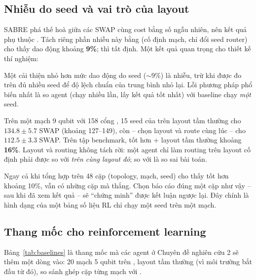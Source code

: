 \subsection{Nhiễu do seed và vai trò của layout}

SABRE phá thế hoà giữa các SWAP cùng cost bằng số ngẫu nhiên, nên kết quả phụ thuộc .
Tách riêng phần nhiễu này bằng  (cố định mạch, chỉ đổi seed router) cho
thấy  dao động khoảng \textbf{9\%};  thì tất định. Một kết
quả quan trọng cho thiết kế thí nghiệm:
\begin{keybox}
Một cải thiện nhỏ hơn mức dao động do seed ($\sim$9\%) là nhiễu, trừ khi được đo trên đủ nhiều seed để
độ lệch chuẩn của trung bình nhỏ lại. Lỗi phương pháp phổ biến nhất là so agent (chạy nhiều lần, lấy
kết quả tốt nhất) với baseline chạy \emph{một} seed.
\end{keybox}

Trên một mạch 9 qubit với 158 cổng \cx{}, 15 seed của  trên layout tầm thường cho
$134.8 \pm 5.7$ SWAP (khoảng 127--149), còn  -- chọn layout và route cùng lúc -- cho
$112.5 \pm 3.3$ SWAP. Trên tập benchmark,  tốt hơn  + layout tầm
thường khoảng \textbf{16\%}. Layout và routing không tách rời: một agent chỉ làm routing trên layout
cố định phải được so với  \emph{trên cùng layout đó}; so với  là so
sai bài toán.

Ngay cả khi tổng hợp trên 48 cặp (topology, mạch, seed) cho thấy  tốt hơn 
khoảng 10\%, vẫn có những cặp mà  thắng. Chọn báo cáo đúng một cặp như vậy -- sau khi đã
xem kết quả -- sẽ ``chứng minh'' được kết luận ngược lại. Đây chính là hình dạng của một bảng số liệu
RL chỉ chạy một seed trên một mạch.

\subsection{Thang mốc cho reinforcement learning}

Bảng~\ref{tab:baselines} là thang mốc mà các agent ở Chuyên đề nghiên cứu 2 sẽ thêm một dòng vào: 20
mạch 5 qubit trên , layout tầm thường (vì môi trường bắt đầu từ đó), so sánh ghép cặp
từng mạch với .


